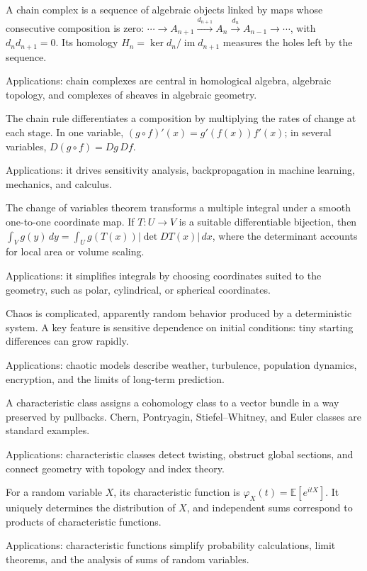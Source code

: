 A chain complex is a sequence of algebraic objects linked by maps whose consecutive composition is zero: $\cdots\to A_{n+1}\xrightarrow{d_{n+1}}A_n\xrightarrow{d_n}A_{n-1}\to\cdots$, with $d_nd_{n+1}=0$. Its homology $H_n=\ker d_n/\operatorname{im}d_{n+1}$ measures the holes left by the sequence. \par\noindent Applications: chain complexes are central in homological algebra, algebraic topology, and complexes of sheaves in algebraic geometry.

The chain rule differentiates a composition by multiplying the rates of change at each stage. In one variable, $(g\circ f)'(x)=g'(f(x))f'(x)$; in several variables, $D(g\circ f)=Dg\,Df$. \par\noindent Applications: it drives sensitivity analysis, backpropagation in machine learning, mechanics, and calculus.

The change of variables theorem transforms a multiple integral under a smooth one-to-one coordinate map. If \(T:U\to V\) is a suitable differentiable bijection, then \(\int_V g(y)\,dy=\int_U g(T(x))|\det DT(x)|\,dx\), where the determinant accounts for local area or volume scaling. \par\noindent Applications: it simplifies integrals by choosing coordinates suited to the geometry, such as polar, cylindrical, or spherical coordinates.

Chaos is complicated, apparently random behavior produced by a deterministic system. A key feature is sensitive dependence on initial conditions: tiny starting differences can grow rapidly. \par\noindent Applications: chaotic models describe weather, turbulence, population dynamics, encryption, and the limits of long-term prediction.

A characteristic class assigns a cohomology class to a vector bundle in a way preserved by pullbacks. Chern, Pontryagin, Stiefel--Whitney, and Euler classes are standard examples. \par\noindent Applications: characteristic classes detect twisting, obstruct global sections, and connect geometry with topology and index theory.

For a random variable $X$, its characteristic function is $\varphi_X(t)=\mathbb E[e^{itX}]$. It uniquely determines the distribution of $X$, and independent sums correspond to products of characteristic functions. \par\noindent Applications: characteristic functions simplify probability calculations, limit theorems, and the analysis of sums of random variables.

